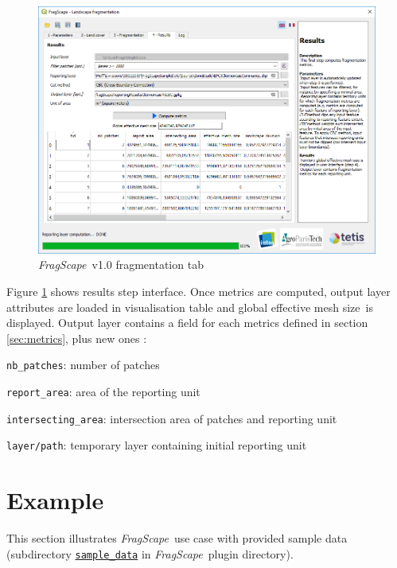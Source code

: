 \documentclass[11pt]{article}
\newcommand{\source}[1]{\vspace*{-0.4cm}\caption*{\textit{Source: {#1}}}}
\newcommand{\tool}{\emph{FragScape}}
\newcommand{\meff}{effective mesh size}
\let\tempone\itemize
\let\temptwo\enditemize
\renewenvironment{itemize}{\tempone\addtolength{\itemsep}{-0.5\baselineskip}}{\temptwo}
\begin{document}
\begin{figure}[h!]
    \centering
    \includegraphics[scale=0.7]{pictures/resultsTabEn.png}
    \caption{\tool\ v1.0 fragmentation tab}
    \label{fig:resultsTab}
\end{figure}


Figure \ref{fig:resultsTab} shows results step interface.
Once metrics are computed, output layer attributes are loaded in visualisation table and global \meff\ is displayed.
Output layer contains a field for each metrics defined in section \ref{sec:metrics}, plus new ones :
\begin{itemize}
    \item \texttt{nb\_patches}: number of patches
    \item \texttt{report\_area}: area of the reporting unit
    \item \texttt{intersecting\_area}: intersection area of patches and reporting unit
    \item \texttt{layer/path}: temporary layer containing initial reporting unit
\end{itemize}

\pagebreak

\section{Example}

This section illustrates \tool\ use case with provided sample data (subdirectory \href{https://github.com/MathieuChailloux/FragScape/tree/master/sample_data/EPCI_Clermontais_2012}{\texttt{sample\_data}} in \tool\ plugin directory).
\end{document}
